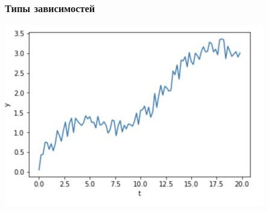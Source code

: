 \documentclass[fullscreen=true, bookmarks=true, hyperref={pdfencoding=unicode}]{beamer}
\begin{document}
\begin{frame}
  \frametitle{Типы зависимостей}

  \begin{center}
    \includegraphics[keepaspectratio,
                   width=.5\paperwidth]{raw_signal.jpg}
  \end{center}



\end{frame}
\end{document}
